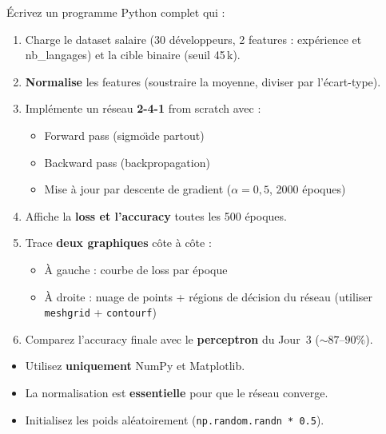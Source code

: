 \'{E}crivez un programme Python complet qui :

\begin{enumerate}[label=\alph*)]
    \item Charge le dataset salaire (30 d\'{e}veloppeurs, 2 features :
        exp\'{e}rience et nb\_langages) et la cible binaire (seuil 45\,k\texteuro).

    \item \textbf{Normalise} les features (soustraire la moyenne, diviser par l'\'{e}cart-type).

    \item Impl\'{e}mente un r\'{e}seau \textbf{2-4-1} from scratch avec :
    \begin{itemize}
        \item Forward pass (sigmo\"{\i}de partout)
        \item Backward pass (backpropagation)
        \item Mise \`{a} jour par descente de gradient ($\alpha = 0{,}5$, 2000 \'{e}poques)
    \end{itemize}

    \item Affiche la \textbf{loss et l'accuracy} toutes les 500 \'{e}poques.

    \item Trace \textbf{deux graphiques} c\^{o}te \`{a} c\^{o}te :
    \begin{itemize}
        \item \`{A} gauche : courbe de loss par \'{e}poque
        \item \`{A} droite : nuage de points + r\'{e}gions de d\'{e}cision du r\'{e}seau
            (utiliser \texttt{meshgrid} + \texttt{contourf})
    \end{itemize}

    \item Comparez l'accuracy finale avec le \textbf{perceptron} du Jour~3 (${\sim}87$--$90\%$).
\end{enumerate}

\begin{attentionbox}[Consignes]
    \begin{itemize}
        \item Utilisez \textbf{uniquement} NumPy et Matplotlib.
        \item La normalisation est \textbf{essentielle} pour que le r\'{e}seau converge.
        \item Initialisez les poids al\'{e}atoirement (\texttt{np.random.randn * 0.5}).
    \end{itemize}
\end{attentionbox}

